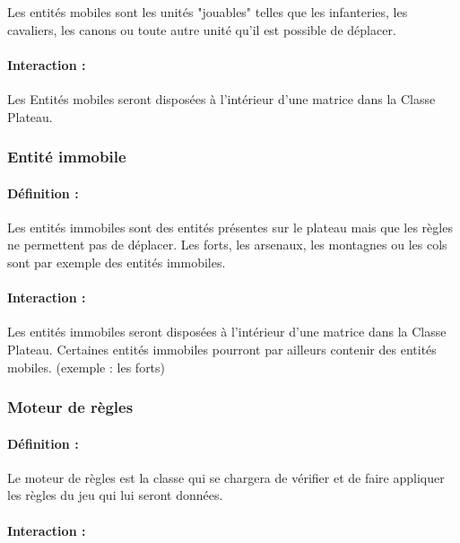\documentclass[12pt]{article}
\begin{document}
				Les entités mobiles sont les unités "jouables" telles que les infanteries, les cavaliers, les canons ou toute autre unité qu'il est possible de déplacer.

				\paragraph{Interaction :}

				Les Entités mobiles seront disposées à l'intérieur d'une matrice dans la Classe Plateau.

			\subsubsection{Entité immobile}

				\paragraph{Définition :}

				Les entités immobiles sont des entités présentes sur le plateau mais que les règles ne permettent pas de déplacer. Les forts, les arsenaux, les montagnes ou les cols sont par exemple des entités immobiles.

				\paragraph{Interaction :}

				Les entités immobiles seront disposées à l'intérieur d'une matrice dans la Classe Plateau. Certaines entités immobiles pourront par ailleurs contenir des entités mobiles. (exemple : les forts)

			\subsubsection{Moteur de règles}

				\paragraph{Définition :}

				Le moteur de règles est la classe qui se chargera de vérifier et de faire appliquer les règles du jeu qui lui seront données.

				\paragraph{Interaction :}
\end{document}
